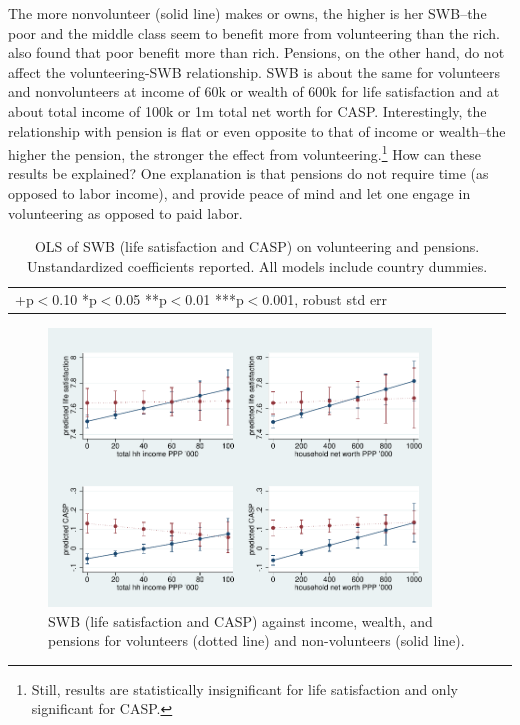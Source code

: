 \documentclass[10pt, letterpaper]{article}
\begin{document}
\begin{spacing}{1.4}
The more nonvolunteer (solid line) makes or owns, the higher is her SWB--the poor and the middle
class seem to benefit more from volunteering than the rich. \citet{dulin2012volunteering} also found that poor benefit more than rich. Pensions, on the
other hand, do not affect the volunteering-SWB relationship.
%
SWB is about the same for volunteers and nonvolunteers at income of 60k or
wealth of 600k for life satisfaction and 
at about total income of 100k or 1m total net worth for CASP.  
% 
Interestingly,  the
relationship with pension is flat or even opposite to that of income or wealth--the higher the
pension, the stronger the effect from volunteering.\footnote{Still, results are
statistically insignificant for life satisfaction and only significant for
CASP.} How can these results be explained?
%
One explanation is that
pensions do not require time (as opposed to labor income), and provide peace of
mind and let one engage in volunteering as opposed to paid labor. 


\begin{spacing}{.9}
\begin{table}[H]\centering \caption{OLS of SWB  (life satisfaction and CASP) on
    volunteering and pensions.  Unstandardized coefficients reported. All models
    include country dummies.}  \begin{scriptsize} \begin{tabular}{p{1.8in}p{.5in}p{.5in}p{.5in}|p{.5in}|p{.5in}p{.5in}p{.5in}p{.5in}p{.5in}p{.4in}p{.5in}p{.4in}}\hline 
      \hline\multicolumn{5}{l}{+p$<$0.10 *p$<$0.05 **p$<$0.01 ***p$<$0.001,
        robust std err} \end{tabular}\label{regDw6} \end{scriptsize}\end{table}
\end{spacing}


\begin{figure}[h!]
  \centering
\includegraphics[width=4in]{regDmarg.pdf}  
  \caption{SWB  (life satisfaction and CASP) against income, wealth, and
    pensions for volunteers (dotted line) and non-volunteers (solid line).}
  \label{mar}
\end{figure}


\end{spacing}
\end{document}
